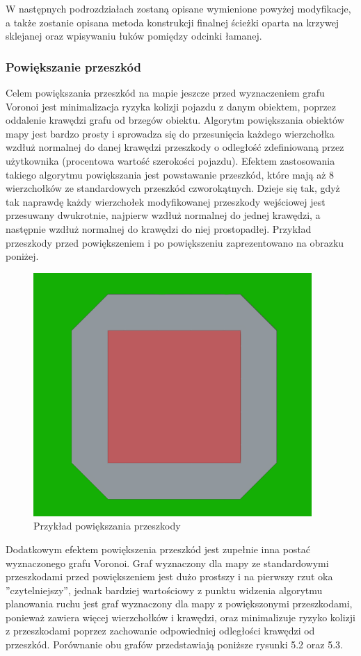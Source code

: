 \documentclass[a4paper,11pt,twoside]{report}
\theoremstyle{definition}
\begin{document}
W następnych podrozdziałach zostaną opisane wymienione powyżej modyfikacje, a także zostanie opisana metoda konstrukcji finalnej ścieżki oparta na krzywej sklejanej oraz wpisywaniu łuków pomiędzy odcinki łamanej.

\subsubsection{Powiększanie przeszkód}

Celem powiększania przeszkód na mapie jeszcze przed wyznaczeniem grafu Voronoi jest minimalizacja ryzyka kolizji pojazdu z danym obiektem, poprzez oddalenie krawędzi grafu od brzegów obiektu. Algorytm powiększania obiektów mapy jest bardzo prosty i sprowadza się do przesunięcia każdego wierzchołka wzdłuż normalnej do danej krawędzi przeszkody o odległość zdefiniowaną przez użytkownika (procentowa wartość szerokości pojazdu). Efektem zastosowania takiego algorytmu powiększania jest powstawanie przeszkód, które mają aż 8 wierzchołków ze standardowych przeszkód czworokątnych. Dzieje się tak, gdyż tak naprawdę każdy wierzchołek modyfikowanej przeszkody wejściowej jest przesuwany dwukrotnie, najpierw wzdłuż normalnej do jednej krawędzi, a następnie wzdłuż normalnej do krawędzi do niej prostopadłej. Przykład przeszkody przed powiększeniem i po powiększeniu zaprezentowano na obrazku poniżej.

\begin{figure}[h!]
\centering
\includegraphics[scale=0.5]{expandObstacleExample}
\caption[Przykład powiększania przeszkody]{Przykład powiększania przeszkody}
\end{figure}

Dodatkowym efektem powiększenia przeszkód jest zupełnie inna postać wyznaczonego grafu Voronoi. Graf wyznaczony dla mapy ze standardowymi przeszkodami przed powiększeniem jest dużo prostszy i na pierwszy rzut oka ''czytelniejszy'', jednak bardziej wartościowy z punktu widzenia algorytmu planowania ruchu jest graf wyznaczony dla mapy z powiększonymi przeszkodami, ponieważ zawiera więcej wierzchołków i krawędzi, oraz minimalizuje ryzyko kolizji z przeszkodami poprzez zachowanie odpowiedniej odległości krawędzi od przeszkód. Porównanie obu grafów przedstawiają poniższe rysunki 5.2 oraz 5.3.
\end{document}
